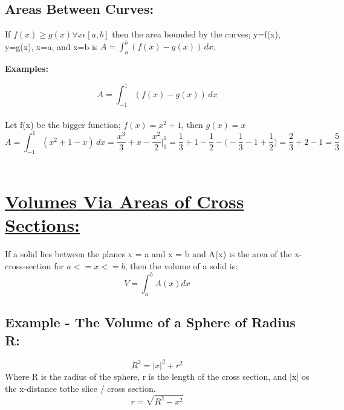 \documentclass[12pt, letterpaper]{article}
\begin{document}
    \subsection*{Areas Between Curves:}
    \begin{flushleft}
        If $f(x)\geq g(x) \forall x\epsilon[a,b]$ then the area bounded by the curves; y=f(x), y=g(x), x=a, and x=b is $A=\int_a^b(f(x)-g(x))\,dx$.\\
    \end{flushleft}
    \textnormal{\textbf{Examples:}}
    \textnormal{\newline\newline}
    \begin{flushleft}
        $$A=\int_{-1}^1(f(x)-g(x))\,dx$$\\
        Let f(x) be the bigger function; $f(x)=x^2+1$, then $g(x)=x$\\
        $$A=\int_{-1}^1(x^2+1-x)\,dx=\frac{x^3}{3}+x-\frac{x^2}{2}\bigg|_1^1=\frac{1}{3}+1-\frac{1}{2}-\bigg(-\frac{1}{3}-1+\frac{1}{2}\bigg)=\frac{2}{3}+2-1=\frac{5}{3}$$\\
    \end{flushleft}
    \newpage
    \section{\underline{Volumes Via Areas of Cross Sections:}}
    \indent If a solid lies between the planes x = a and x = b and A(x) is the area of the x-cross-section for $a<= x <= b$, then the volume of a solid is:
        \begin{equation}
            V = \int_{a}^{b} A(x) dx
        \end{equation}
    \subsection*{Example - The Volume of a Sphere of Radius R:}
    \begin{equation*}
        R^2 = |x|^2 + r^2
    \end{equation*}
    Where R is the radius of the sphere, r is the length of the cross section, and |x| os the x-distance tothe slice / cross section. 
    \begin{equation*}
        r = \sqrt{R^2 - x^2}
    \end{equation*}
\end{document}
